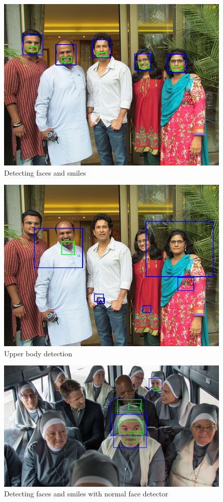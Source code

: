 \documentclass{article}
\begin{document}
\begin{figure}
\center
            \includegraphics[width=1\textwidth]{pplfacesmile}
\caption{Detecting faces and smiles}
\end{figure}     
\begin{figure}
\center
            \includegraphics[width=1\textwidth]{pplub}
\caption{Upper body detection}
\end{figure}      
\begin{figure}
\center
            \includegraphics[width=1\textwidth]{hbd}
\caption{Detecting faces and smiles with normal face detector}
\end{figure}       
\end{document}
